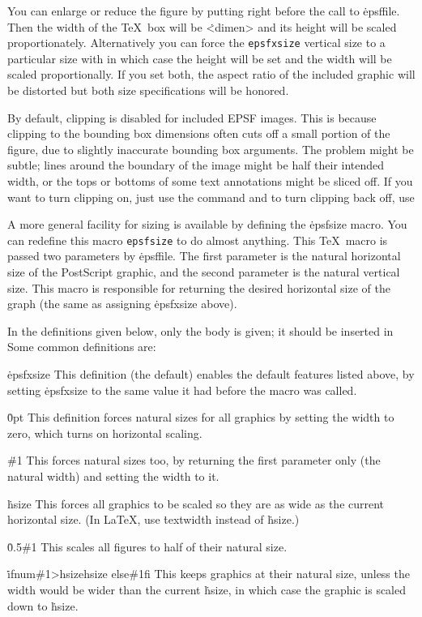 You can enlarge or reduce the figure by putting
\noindent
right before the call to \.{epsffile}.
Then the width of the \TeX\ box will be \.{<dimen>} and its
height will be scaled proportionately.  Alternatively you can force the
\^{{\tt epsfxsize}}
vertical size to a particular size with
\noindent
in which case the height will be set and the width will be scaled
proportionally.  If you set both, the aspect ratio of the included
graphic will be distorted but both size specifications will be
honored.

By default, clipping is disabled for included EPSF images.  This is
because clipping to the bounding box dimensions often cuts off a
small portion of the figure, due to slightly inaccurate bounding
box arguments.  The problem might be subtle; lines around the boundary
of the image might be half their intended width, or the tops or
bottoms of some text annotations might be sliced off.  If you want to
turn clipping on, just use the command
\noindent
and to turn clipping back off, use

A more general facility for sizing is available by defining the
\.{epsfsize} macro.   You can redefine this macro
\^{{\tt epsfsize}}
to do almost anything.  This \TeX\ macro is passed two parameters
by \.{epsffile}.  The first parameter is the natural horizontal size of
the PostScript graphic, and the second parameter is the natural vertical
size.  This macro is responsible for returning the desired horizontal size of
the graph (the same as assigning \.{epsfxsize} above).

In the definitions given below, only the body is given; it should be inserted
in
\noindent
Some common definitions are:

{\options
\.{\ttbackslash epsfxsize}
This definition (the default) enables the default features listed above,
by setting \.{epsfxsize} to the same value it had before the macro was
called.

\.{0pt}
This definition forces natural sizes for all graphics by setting the width to
zero, which turns on horizontal scaling.

\.{\#1}
This forces natural sizes too, by returning the first parameter only
(the natural width) and setting the width to it.

\.{\ttbackslash hsize}
This forces all graphics to be scaled so they are as wide as the current
horizontal size.  (In La\TeX, use \.{textwidth} instead of \.{hsize}.)

\.{0.5\#1}
This scales all figures to half of their natural size.

\.{\ttbackslash ifnum\#1>\ttbackslash hsize\ttbackslash hsize\ttbackslash
else\#1\ttbackslash fi}
This keeps graphics at their natural size, unless the width would be wider
than the current \.{hsize}, in which case the graphic is scaled down to
\.{hsize}.\par}

